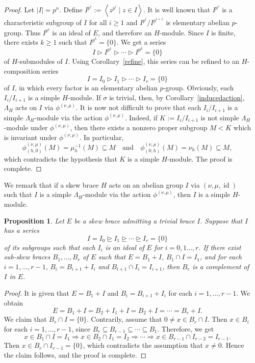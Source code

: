 \documentclass[11pt]{amsart}
\theoremstyle{thrm}
\theoremstyle{plain}
\newtheorem{prop}[thm]{Proposition}
\theoremstyle{definition}
\newcommand{\Id}{\operatorname{id}}
\newcommand{\gen}[1]{\left < #1 \right >}
\numberwithin{equation}{section}
\begin{document}
\begin{proof}
Let $|I| = p^n$. Define $I^{p^{i}} := \gen{z^{p^{i}} \mid z \in I}$. It is well known that $I^{p^{i}} $ is a characteristic subgroup of $I$ for all $i \ge 1$ and $I^{p^{i}}/I^{p^{i+1}}$ is elementary abelian $p$-group. Thus $I^{p^{i}}$ is an ideal of $E$, and therefore an $H$-module. Since $I$ is finite, there exists $k \ge 1$ such that $I^{p^{k}} = \{0\}$. We get a series 
$$I \rhd I^{p^{1}}  \rhd \cdots  \rhd I^{p^{k}} = \{0\}$$
 of $H$-submodules  of $I$.   Using Corollary~\ref{refine}, this series can be refined to an $H$-composition series 
$$ I = I_0 \rhd I_1 \rhd \cdots \rhd I_r = \{0\}$$
of $I$, in which every factor  is an elementary abelian $p$-group. Obviously,  each  $I_i/I_{i+1}$ is a simple $H$-module.  If $\sigma$ is trivial, then, by Corollary~\ref{inducedaction}, $\Lambda_H$ acts on $I$ via $\phi^{(\nu, \mu)}$. It is now not difficult to prove that  each $I_i / I_{i+1}$ is a simple $\Lambda_H$-module via the action $\phi^{(\nu, \mu)}$. Indeed, 	if  $K:=I_i / I_{i+1}$ is not simple $\Lambda_H$-module under $\phi^{(\nu, \mu)}$, then there exists a nonzero proper subgroup \(M < K\) which is invariant under \(\phi^{(\nu, \mu)}\).  
In particular,
	\[
	\phi^{(\nu, \mu)}_{(h,0)}(M)=\mu^{-1}_h(M)\subseteq M
	\quad\text{and}\quad
	\phi^{(\nu, \mu)}_{(0,h)}(M)=\nu_h(M)\subseteq M,
	\]
	which contradicts the hypothesis that $K$ is a simple $H$-module. The proof is complete.
\end{proof}

We remark that if a skew brace $H$ acts on an abelian group $I$ via $(\nu, \mu, \Id)$ such that $I$ is a simple $\Lambda_H$-module via the action $\phi^{(\nu, \mu)}$, then $I$ is a simple $H$-module. 

\begin{prop}
Let $E$ be a skew brace admitting a trivial brace $I$. Suppose that $I$ has a series
$$I = I_0 \trianglerighteq I_1 \trianglerighteq \cdots \trianglerighteq I_r = \{0\}$$
of its subgroups such that each $I_i$ is an ideal of $E$ for $i = 0,1 \ldots, r$. If there exist sub-skew braces $B_1, \ldots, B_r$ of $E$ such that $E = B_1+ I$, $B_1 \cap I = I_1$, and for each $i = 1, \ldots, r-1$, $B_i = B_{i+1} + I_i$ and $B_{i+1} \cap I_i = I_{i+1}$, then  $B_r$ is a complement of $I$ in $E$. 
\end{prop}

\begin{proof}
It is given that $E = B_1 + I$ and $B_i = B_{i+1} + I_i$ for each $i = 1, \ldots, r-1$. We obtain
	\[
	E = B_1 + I = B_2 + I_1 + I = B_2 +  I = \cdots = B_r + I.
	\]
We claim that  $B_r \cap I = \{0\}$. Contrarily, assume that $0 \ne  x \in B_r \cap I$. Then $x \in B_i$ for each  $i = 1, \ldots, r-1$, since $B_r \subseteq B_{r-1} \subseteq \cdots \subseteq B_1$. Therefore, we get
	\[
	x \in B_1 \cap I = I_1 \Rightarrow x \in B_2 \cap I_1 = I_2 \Rightarrow \cdots \Rightarrow x \in B_{r-1} \cap I_{r-2} = I_{r-1}.
	\]
Then $x \in B_r \cap I_{r-1} = \{0\}$, which contradicts the assumption that $x \ne 0$. Hence the claim follows, and the proof is complete.
\end{proof}
\end{document}
